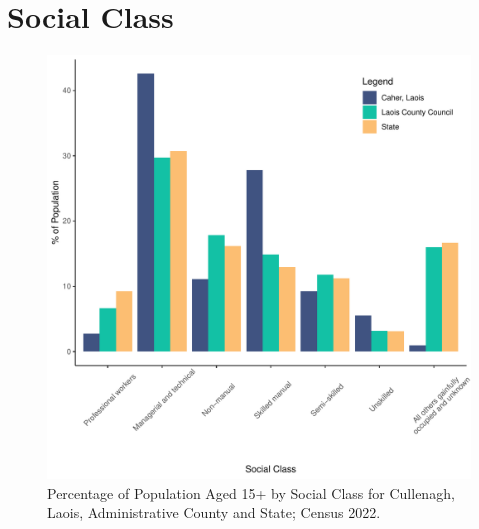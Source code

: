 \documentclass{article}
\begin{document}
\section{Social Class}\label{sect:SC}
\begin{figure}[H]
	\centering
	\includegraphics[width = 140mm]{../figures/SocialClassED.pdf}
	\caption{Percentage of Population Aged 15+ by Social Class for Cullenagh, Laois, Administrative County and State; Census 2022.}
	\label{fig:vbnv}
	\end{figure}
\end{document}
